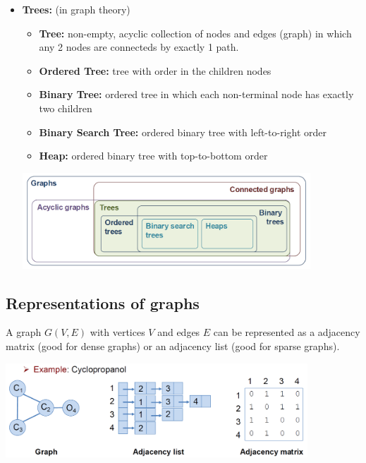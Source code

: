 \begin{itemize}
    \item \textbf{Trees:} (in graph theory)
    \begin{itemize}
        \item \textbf{Tree:} non-empty, acyclic collection of nodes and edges (graph) in which any 2 nodes are connecteds by exactly 1 path.  
        \item \textbf{Ordered Tree:} tree with order in the children nodes
        \item \textbf{Binary Tree:} ordered tree in which each non-terminal node has exactly two children
        \item \textbf{Binary Search Tree:} ordered binary tree with left-to-right order
        \item \textbf{Heap:} ordered binary tree with top-to-bottom order
    \end{itemize}
    \begin{center}\includegraphics[width=0.85\textwidth]{img/graphs/GraphsTrees.png}\end{center}
\end{itemize}

\subsection{Representations of graphs}

A graph $G(V,E)$ with vertices $V$ and edges $E$ can be represented as a adjacency matrix (good for dense graphs) or an adjacency list (good for sparse graphs). 

\begin{center}\includegraphics[width=0.85\textwidth]{img/graphs/MatrixVsList.png}\end{center}

